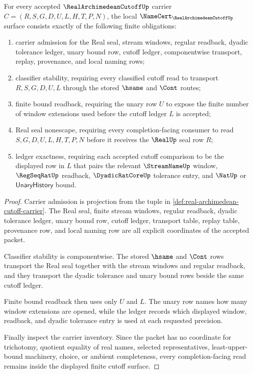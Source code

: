 \begin{theorem}
\label{thm:real-archimedean-cutoff-namecert-obligations}
For every accepted $\RealArchimedeanCutoffUp$ carrier
$C=(R,S,G,D,U,L,H,T,P,N)$, the local
$\NameCert_{\RealArchimedeanCutoffUp}$ surface consists exactly of the
following finite obligations:
\begin{enumerate}
\item carrier admission for the Real seal, stream windows, regular readback,
dyadic tolerance ledger, unary bound row, cutoff ledger, componentwise
transport, replay, provenance, and local naming rows;
\item classifier stability, requiring every classified cutoff read to
transport $R,S,G,D,U,L$ through the stored $\hsame$ and $\Cont$ routes;
\item finite bound readback, requiring the unary row $U$ to expose the finite
number of window extensions used before the cutoff ledger $L$ is accepted;
\item Real seal nonescape, requiring every completion-facing consumer to read
$S,G,D,U,L,H,T,P,N$ before it receives the $\RealUp$ seal row $R$;
\item ledger exactness, requiring each accepted cutoff comparison to be the
displayed row in $L$ that pairs the relevant $\StreamNameUp$ window,
$\RegSeqRatUp$ readback, $\DyadicRatCoreUp$ tolerance entry, and
$\NatUp$ or $\mathsf{UnaryHistory}$ bound.
\end{enumerate}
\end{theorem}
\begin{proof}
Carrier admission is projection from the tuple in
\autoref{def:real-archimedean-cutoff-carrier}. The Real seal, finite stream
windows, regular readback, dyadic tolerance ledger, unary bound row, cutoff
ledger, transport table, replay table, provenance row, and local naming row
are all explicit coordinates of the accepted packet.

Classifier stability is componentwise. The stored $\hsame$ and $\Cont$ rows
transport the Real seal together with the stream windows and regular readback,
and they transport the dyadic tolerance and unary bound rows beside the same
cutoff ledger.

Finite bound readback then uses only $U$ and $L$. The unary row names how many
window extensions are opened, while the ledger records which displayed
window, readback, and dyadic tolerance entry is used at each requested
precision.

Finally inspect the carrier inventory. Since the packet has no coordinate for
trichotomy, quotient equality of real names, selected representatives,
least-upper-bound machinery, choice, or ambient completeness, every
completion-facing read remains inside the displayed finite cutoff surface.
\end{proof}

